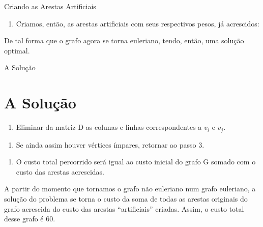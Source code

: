 \documentclass[xcolor=table]{beamer}
\begin{document}
\begin{frame}{Criando as Arestas Artificiais}
\begin{enumerate}[4]
    \item Criamos, então, as arestas artificiais com seus respectivos pesos, já acrescidos: 
\end{enumerate}

\begin{center}
\end{center}

De tal forma que o grafo agora se torna euleriano, tendo, então, uma solução optimal.   
    
\end{frame}

\begin{frame}{A Solução}
\section{A Solução}

\begin{enumerate}[5]
    \item Eliminar da matriz D as colunas e linhas correspondentes a $v_{i}$ e $v_{j}$.
\end{enumerate}
\begin{enumerate}[6]
    \item Se ainda assim houver vértices ímpares, retornar ao passo 3.
\end{enumerate}
\begin{enumerate}[7]
    \item O custo total percorrido será igual ao custo inicial do grafo G somado com o custo das arestas acrescidas.
\end{enumerate}

A partir do momento que tornamos o grafo não euleriano num grafo euleriano, a solução do problema se torna o custo da soma de todas as arestas originais do grafo acrescida do custo das arestas ``artificiais'' criadas. Assim, o custo total desse grafo é 60.
    
\end{frame}
\end{document}
